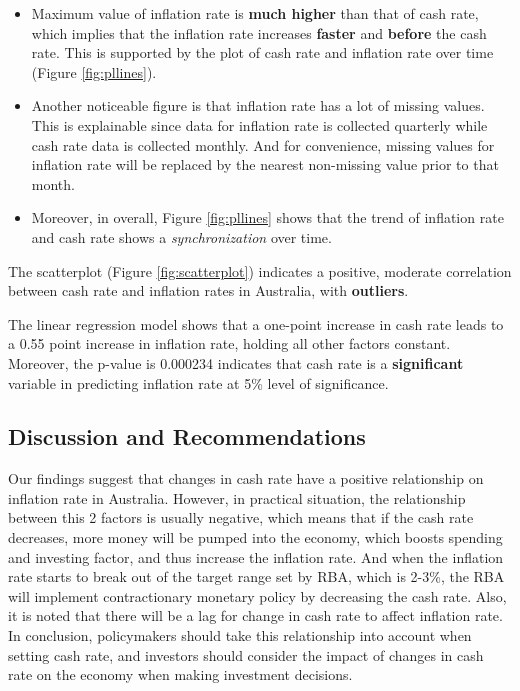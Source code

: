 \documentclass[11pt,a4paper,]{article}
\providecommand{\tightlist}{%
  \setlength{\itemsep}{0pt}\setlength{\parskip}{0pt}}
\begin{document}
\begin{itemize}
\tightlist
\item
  Maximum value of inflation rate is \textbf{much higher} than that of cash rate, which implies that the inflation rate increases \textbf{faster} and \textbf{before} the cash rate. This is supported by the plot of cash rate and inflation rate over time (Figure \ref{fig:pllines}).
\item
  Another noticeable figure is that inflation rate has a lot of missing values. This is explainable since data for inflation rate is collected quarterly while cash rate data is collected monthly. And for convenience, missing values for inflation rate will be replaced by the nearest non-missing value prior to that month.
\item
  Moreover, in overall, Figure \ref{fig:pllines} shows that the trend of inflation rate and cash rate shows a \emph{synchronization} over time.
\end{itemize}

The scatterplot (Figure \ref{fig:scatterplot}) indicates a positive, moderate correlation between cash rate and inflation rates in Australia, with \textbf{outliers}.

The linear regression model shows that a one-point increase in cash rate leads to a 0.55 point increase in inflation rate, holding all other factors constant. Moreover, the p-value is 0.000234 indicates that cash rate is a \textbf{significant} variable in predicting inflation rate at 5\% level of significance.

\hypertarget{discussion-and-recommendations}{%
\subsection{Discussion and Recommendations}\label{discussion-and-recommendations}}

Our findings suggest that changes in cash rate have a positive relationship on inflation rate in Australia. However, in practical situation, the relationship between this 2 factors is usually negative, which means that if the cash rate decreases, more money will be pumped into the economy, which boosts spending and investing factor, and thus increase the inflation rate. And when the inflation rate starts to break out of the target range set by RBA, which is 2-3\%, the RBA will implement contractionary monetary policy by decreasing the cash rate. Also, it is noted that there will be a lag for change in cash rate to affect inflation rate. In conclusion, policymakers should take this relationship into account when setting cash rate, and investors should consider the impact of changes in cash rate on the economy when making investment decisions.
\end{document}
